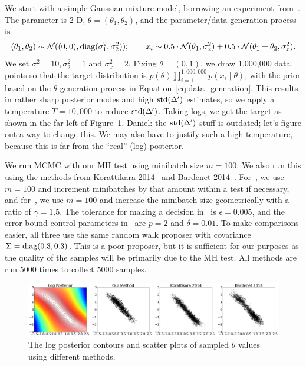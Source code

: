 \documentclass{article}
\begin{document}
We start with a simple Gaussian mixture model, borrowing an experiment
from~\cite{langevin_2011}.  The parameter is 2-D, $\theta =
(\theta_1,\theta_2)$, and the parameter/data generation process is
\begin{equation}\label{eq:data_generation}
    (\theta_1,\theta_2) \sim \mathcal{N}((0,0), {\rm diag}(\sigma_1^2, \sigma_2^2));\quad \quad x_i \sim
    0.5 \cdot \mathcal{N}(\theta_1, \sigma_x^2) + 0.5 \cdot \mathcal{N}(\theta_1+\theta_2, \sigma_x^2).
\end{equation}
We set $\sigma_1^2 = 10, \sigma_2^2 = 1$ and $\sigma_x^2=2$. Fixing $\theta =
(0,1)$, we draw 1,000,000 data points so that the target distribution is
$p(\theta)\prod_{i=1}^{1,000,000}p(x_i\mid \theta)$, with the prior based on the
$\theta$ generation process in Equation~\ref{eq:data_generation}. This results
in rather sharp posterior modes and high ${\rm std}(\Delta')$ estimates, so we
apply a temperature $T=10,000$ to reduce ${\rm std}(\Delta')$. Taking logs, we
get the target as shown in the far left of Figure~\ref{fig:gauss_mix_1}.
{\color{blue} Daniel: the ${\rm std}(\Delta')$ stuff is outdated; let's figure
out a way to change this. We may also have to justify such a high temperature,
because this is far from the ``real'' (log) posterior.}

We run MCMC with our MH test using minibatch size $m=100$.  We also run this
using the methods from Korattikara 2014~\cite{cutting_mh_2014} and
Bardenet 2014~\cite{icml2014c1_bardenet14}. For~\cite{cutting_mh_2014}, we use
$m=100$ and increment minibatches by that amount within a test if necessary, and
for~\cite{icml2014c1_bardenet14}, we use $m=100$ and increase the minibatch size
geometrically with a ratio of $\gamma = 1.5$. The tolerance for making a
decision in~\cite{cutting_mh_2014} is $\epsilon=0.005$, and the error bound
control parameters in~\cite{icml2014c1_bardenet14} are $p = 2$ and $\delta =
0.01$. To make comparisons easier, all three use the same random walk proposer
with covariance $\Sigma={\rm diag}(0.3, 0.3)$. This is a poor proposer, but it
is sufficient for our purposes as the quality of the samples will be primarily
due to the MH test. All methods are run 5000 times to collect 5000 samples.

\begin{figure}[t]
    \centering
    \includegraphics[width=1\linewidth]{GaussianMixtureResult/posterior_of_gaussian.png}
    \caption{
    The log posterior contours and scatter plots of sampled $\theta$ values using different methods. 
    }
    \label{fig:gauss_mix_1}
\end{figure}
\end{document}

